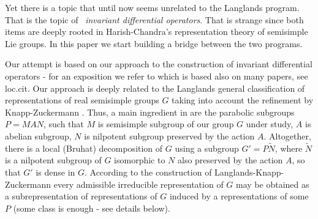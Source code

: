 \documentclass[a4paper]{jpconf}
\begin{document}
Yet there is a topic that until now seems unrelated to the Langlands program.  That is the topic of ~{\it invariant differential operators}. That is strange since both items are deeply rooted in Harish-Chandra's representation theory of semisimple Lie groups.  In this paper we start building a bridge between the two programs.

Our attempt is based on our approach to the construction of invariant differential operators - for an exposition we refer to \cite{VKD1} which is based also on many papers, see loc.cit.
Our approach is deeply related to the Langlands general classification of  representations of real semisimple groups $G$ \cite{Lan2} taking into account the refinement by Knapp-Zuckermann \cite{KnZu}. Thus, a main ingredient in \cite{Lan2} are the parabolic subgroups $P=MAN$, such that $M$ is semisimple subgroup of our group $G$ under study, $A$ is abelian subgroup, $N$ is nilpotent subgroup preserved by the action $A$. Altogether, there is a local (Bruhat) decomposition of $G$ using   a subgroup $G'= P\tilde{N}$, where $\tilde{N}$ is a  nilpotent subgroup of $G$ isomorphic to $N$ also preserved by the action $A$, so that $G'$ is dense in $G$.
According to the construction of Langlands-Knapp-Zuckermann every admissible irreducible representation  of $G$ may be obtained as a subrepresentation of representations of $G$ induced by a representations of some $P$ (some class is enough - see details below).
\end{document}
